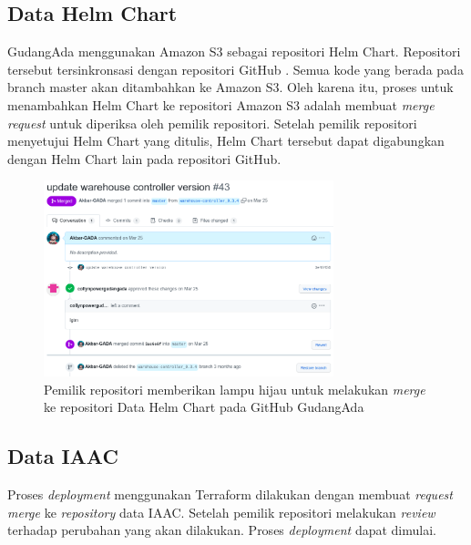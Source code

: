 \subsection{Data Helm Chart}
\label{sec:mergeHelmChart}

GudangAda menggunakan Amazon S3 sebagai repositori Helm Chart. Repositori tersebut tersinkronsasi dengan repositori GitHub . Semua kode yang berada pada branch master akan ditambahkan ke Amazon S3. Oleh karena itu, proses untuk menambahkan Helm Chart ke repositori Amazon S3 adalah membuat \textit{merge request} untuk diperiksa oleh pemilik repositori. Setelah pemilik repositori menyetujui Helm Chart yang ditulis, Helm Chart tersebut dapat digabungkan dengan Helm Chart lain pada repositori GitHub. 

\begin{figure}
	\centering
	\includegraphics[width=0.75\textwidth]{pics/chart-lgtm.png}
	\caption{Pemilik repositori memberikan lampu hijau untuk melakukan \textit{merge} ke repositori Data Helm Chart pada GitHub GudangAda}
	\label{fig:wcLGTMTF}
\end{figure}

\subsection{Data IAAC}
\label{sec:mergeTerraform}
Proses \textit{deployment} menggunakan Terraform dilakukan dengan membuat \textit{request merge} ke \textit{repository} data IAAC. Setelah pemilik repositori melakukan \textit{review} terhadap perubahan yang akan dilakukan. Proses \textit{deployment} dapat dimulai.

